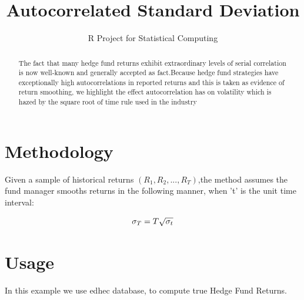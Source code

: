 \documentclass[12pt,letterpaper,english]{article}
\title{Autocorrelated Standard Deviation}
\author{R Project for Statistical Computing}
\begin{document}


\maketitle


\begin{abstract}
The fact that many hedge fund returns exhibit extraordinary levels of serial correlation is now well-known and generally accepted as fact.Because hedge fund strategies have exceptionally high autocorrelations in reported returns and this is taken as evidence of return smoothing, we highlight the effect autocorrelation has on volatility which is hazed by the square root of time rule used in the industry
\end{abstract}



\section{Methodology}
Given a sample of historical returns \((R_1,R_2, . . .,R_T)\),the method assumes the fund manager smooths returns in the following manner, when 't' is the unit time interval:

  
\begin{equation}
 \sigma_{T}  =  T \sqrt{\sigma_{t}} \\
\end{equation}


\section{Usage}

In this example we use edhec database, to compute true Hedge Fund Returns.
\end{document}
